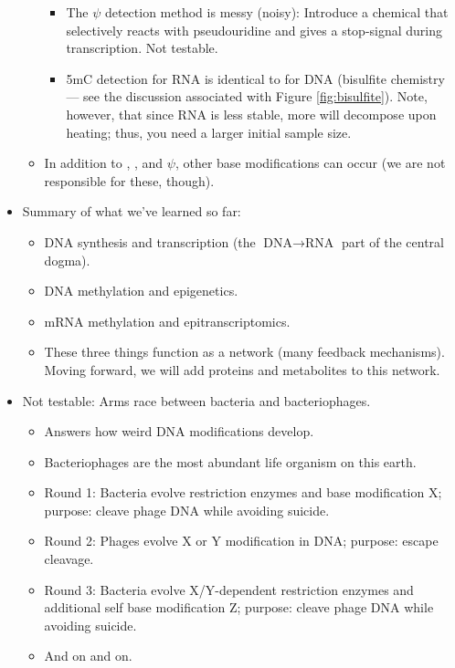 \documentclass[../notes.tex]{subfiles}
\begin{document}
\begin{itemize}
\begin{itemize}
\begin{itemize}
            \item The $\psi$ detection method is messy (noisy): Introduce a chemical that selectively reacts with pseudouridine and gives a stop-signal during transcription. Not testable.
            \item 5mC detection for RNA is identical to for DNA (bisulfite chemistry --- see the discussion associated with Figure \ref{fig:bisulfite}). Note, however, that since RNA is less stable, more will decompose upon heating; thus, you need a larger initial sample size.
        \end{itemize}
        \item In addition to , , and $\psi$, other base modifications can occur (we are not responsible for these, though).
    \end{itemize}
    \item Summary of what we've learned so far:
    \begin{itemize}
        \item DNA synthesis and transcription (the $\text{DNA}\to\text{RNA}$ part of the central dogma).
        \item DNA methylation and epigenetics.
        \item mRNA methylation and epitranscriptomics.
        \item These three things function as a network (many feedback mechanisms). Moving forward, we will add proteins and metabolites to this network.
    \end{itemize}
    \item Not testable: Arms race between bacteria and bacteriophages.
    \begin{itemize}
        \item Answers how weird DNA modifications develop.
        \item Bacteriophages are the most abundant life organism on this earth.
        \item Round 1: Bacteria evolve restriction enzymes and base modification X; purpose: cleave phage DNA while avoiding suicide.
        \item Round 2: Phages evolve X or Y modification in DNA; purpose: escape cleavage.
        \item Round 3: Bacteria evolve X/Y-dependent restriction enzymes and additional self base modification Z; purpose: cleave phage DNA while avoiding suicide.
        \item And on and on.
    \end{itemize}

\end{itemize}
\end{document}
